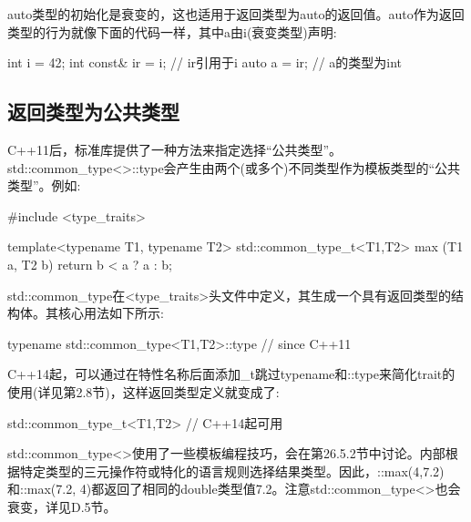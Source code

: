 auto类型的初始化是衰变的，这也适用于返回类型为auto的返回值。auto作为返回类型的行为就像下面的代码一样，其中a由i(衰变类型)声明:

\begin{cpp}
int i = 42;
int const& ir = i; // ir引用于i
auto a = ir; // a的类型为int
\end{cpp}

\subsection{返回类型为公共类型}

C++11后，标准库提供了一种方法来指定选择“公共类型”。std::common\_type<>::type会产生由两个(或多个)不同类型作为模板类型的“公共类型”。例如:

\begin{cpp}
#include <type_traits>

template<typename T1, typename T2>
std::common_type_t<T1,T2> max (T1 a, T2 b)
{
	return b < a ? a : b;
}
\end{cpp}

std::common\_type在<type\_traits>头文件中定义，其生成一个具有返回类型的结构体。其核心用法如下所示:

\begin{cpp}
typename std::common_type<T1,T2>::type // since C++11
\end{cpp}

C++14起，可以通过在特性名称后面添加\_t跳过typename和::type来简化trait的使用(详见第2.8节)，这样返回类型定义就变成了:

\begin{cpp}
std::common_type_t<T1,T2> // C++14起可用
\end{cpp}

std::common\_type<>使用了一些模板编程技巧，会在第26.5.2节中讨论。内部根据特定类型的三元操作符或特化的语言规则选择结果类型。因此，::max(4,7.2)和::max(7.2, 4)都返回了相同的double类型值7.2。注意std::common\_type<>也会衰变，详见D.5节。




